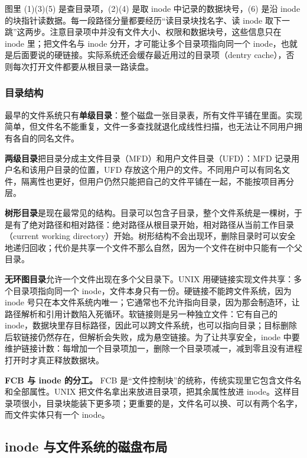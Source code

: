 图里 (1)(3)(5) 是查目录项，(2)(4) 是取 inode 中记录的数据块号，(6) 是沿 inode 的块指针读数据。每一段路径分量都要经历“读目录块找名字、读 inode 取下一跳”这两步。注意目录项中并没有文件大小、权限和数据块号，这些信息只在 inode 里；把文件名与 inode 分开，才可能让多个目录项指向同一个 inode，也就是后面要说的硬链接。实际系统还会缓存最近用过的目录项（dentry cache），否则每次打开文件都要从根目录一路读盘。

\subsubsection{目录结构}

最早的文件系统只有\textbf{单级目录}：整个磁盘一张目录表，所有文件平铺在里面。实现简单，但文件名不能重复，文件一多查找就退化成线性扫描，也无法让不同用户拥有各自的同名文件。

\textbf{两级目录}把目录分成主文件目录（MFD）和用户文件目录（UFD）：MFD 记录用户名和该用户目录的位置，UFD 存放这个用户的文件。不同用户可以有同名文件，隔离性也更好，但用户仍然只能把自己的文件平铺在一起，不能按项目再分层。

\textbf{树形目录}是现在最常见的结构。目录可以包含子目录，整个文件系统是一棵树，于是有了绝对路径和相对路径：绝对路径从根目录开始，相对路径从当前工作目录（current working directory）开始。树形结构不会出现环，删除目录时可以安全地递归回收；代价是共享一个文件不那么自然，因为一个文件在树中只能有一个父目录。

\textbf{无环图目录}允许一个文件出现在多个父目录下。UNIX 用硬链接实现文件共享：多个目录项指向同一个 inode，文件本身只有一份。硬链接不能跨文件系统，因为 inode 号只在本文件系统内唯一；它通常也不允许指向目录，因为那会制造环，让路径解析和引用计数陷入死循环。软链接则是另一种独立文件：它有自己的 inode，数据块里存目标路径，因此可以跨文件系统，也可以指向目录；目标删除后软链接仍然存在，但解析会失败，成为悬空链接。为了让共享安全，inode 中要维护链接计数：每增加一个目录项加一，删除一个目录项减一，减到零且没有进程打开时才真正释放数据块。

\begin{attention}
\textbf{FCB 与 inode 的分工。} FCB 是“文件控制块”的统称，传统实现里它包含文件名和全部属性。UNIX 把文件名拿出来放进目录项，把其余属性放进 inode。这样目录项很小，目录块能装下更多项；更重要的是，文件名可以换、可以有两个名字，而文件实体只有一个 inode。
\end{attention}

\subsection{inode 与文件系统的磁盘布局}

